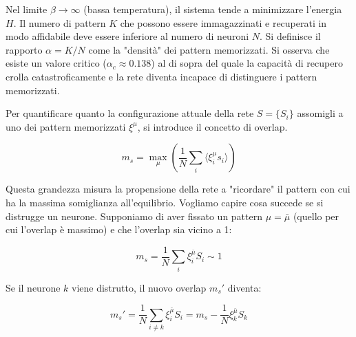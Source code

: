 Nel limite $\beta \rightarrow \infty$ (bassa temperatura), il sistema tende a minimizzare l'energia $H$.
Il numero di pattern $K$ che possono essere immagazzinati e recuperati in modo affidabile deve essere inferiore al numero di neuroni $N$.
Si definisce il rapporto $\alpha = K/N$ come la "densità" dei pattern memorizzati. Si osserva che esiste un valore critico ($\alpha_c \approx 0.138$) al di sopra del quale la capacità di recupero crolla catastroficamente e la rete diventa incapace di distinguere i pattern memorizzati.

\vspace{0.5cm}
\noindent{}
\vspace{0.5cm}

Per quantificare quanto la configurazione attuale della rete $S = \{S_i\}$ assomigli a uno dei pattern memorizzati $\xi^\mu$, si introduce il concetto di overlap.

\begin{equation} \label{eq:ch22_6}
m_s = \max_{\mu} \left( \frac{1}{N} \sum_i \langle \xi_i^\mu s_i \rangle \right)
\end{equation}

Questa grandezza misura la propensione della rete a "ricordare" il pattern con cui ha la massima somiglianza all'equilibrio.
Vogliamo capire cosa succede se si distrugge un neurone.
Supponiamo di aver fissato un pattern $\mu = \bar{\mu}$ (quello per cui l'overlap è massimo) e che l'overlap sia vicino a 1:

\begin{equation} \label{eq:ch22_7}
m_s = \frac{1}{N} \sum_i \xi_i^{\bar{\mu}} S_i \sim 1
\end{equation}

Se il neurone $k$ viene distrutto, il nuovo overlap $m_s'$ diventa:

\begin{equation} \label{eq:ch22_8}
m_s' = \frac{1}{N} \sum_{i \neq k} \xi_i^{\bar{\mu}} S_i = m_s - \frac{1}{N} \xi_k^{\bar{\mu}} S_k
\end{equation}

